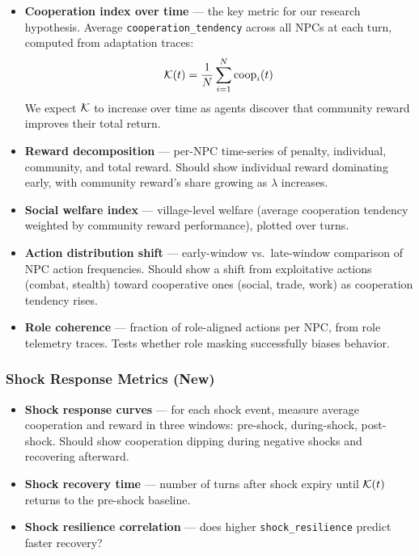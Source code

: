 \begin{itemize}
    \item \textbf{Cooperation index over time} --- the key metric for our research hypothesis. Average \texttt{cooperation\_tendency} across all NPCs at each turn, computed from adaptation traces:
    $$\mathcal{K}(t) = \frac{1}{N} \sum_{i=1}^{N} \text{coop}_i(t)$$
    We expect $\mathcal{K}$ to increase over time as agents discover that community reward improves their total return.

    \item \textbf{Reward decomposition} --- per-NPC time-series of penalty, individual, community, and total reward. Should show individual reward dominating early, with community reward's share growing as $\lambda$ increases.

    \item \textbf{Social welfare index} --- village-level welfare (average cooperation tendency weighted by community reward performance), plotted over turns.

    \item \textbf{Action distribution shift} --- early-window vs.\ late-window comparison of NPC action frequencies. Should show a shift from exploitative actions (combat, stealth) toward cooperative ones (social, trade, work) as cooperation tendency rises.

    \item \textbf{Role coherence} --- fraction of role-aligned actions per NPC, from role telemetry traces. Tests whether role masking successfully biases behavior.
\end{itemize}

\subsubsection{Shock Response Metrics (New)}

\begin{itemize}
    \item \textbf{Shock response curves} --- for each shock event, measure average cooperation and reward in three windows: pre-shock, during-shock, post-shock. Should show cooperation dipping during negative shocks and recovering afterward.

    \item \textbf{Shock recovery time} --- number of turns after shock expiry until $\mathcal{K}(t)$ returns to the pre-shock baseline.

    \item \textbf{Shock resilience correlation} --- does higher \texttt{shock\_resilience} predict faster recovery?
\end{itemize}

